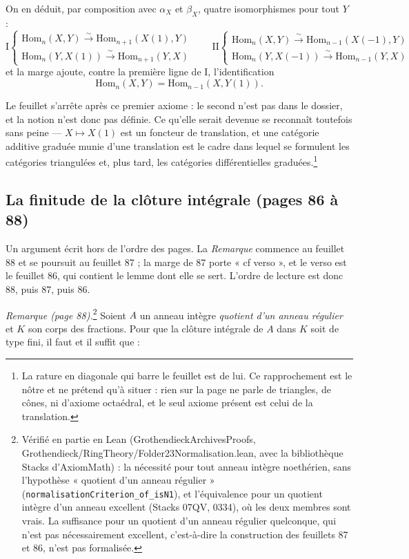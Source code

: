 \documentclass[11pt,a4paper]{article}
\begin{document}
On en déduit, par composition avec $\alpha_{X}$ et $\beta_{X}$, quatre
isomorphismes pour tout $Y$ :
\[
  \text{I}
  \begin{cases}
    \mathrm{Hom}_{n}(X, Y) \xrightarrow{\sim} \mathrm{Hom}_{n+1}(X(1), Y) \\
    \mathrm{Hom}_{n}(Y, X(1)) \xrightarrow{\sim} \mathrm{Hom}_{n+1}(Y, X)
  \end{cases}
  \qquad
  \text{II}
  \begin{cases}
    \mathrm{Hom}_{n}(X, Y) \xrightarrow{\sim} \mathrm{Hom}_{n-1}(X(-1), Y) \\
    \mathrm{Hom}_{n}(Y, X(-1)) \xrightarrow{\sim} \mathrm{Hom}_{n-1}(Y, X)
  \end{cases}
\]
et la marge ajoute, contre la première ligne de I, l'identification
\[
  \mathrm{Hom}_{n}(X,Y) = \mathrm{Hom}_{n-1}(X, Y(1)) .
\]

Le feuillet s'arrête après ce premier axiome : le second n'est pas dans le
dossier, et la notion n'est donc pas définie. Ce qu'elle serait devenue se
reconnaît toutefois sans peine — $X \mapsto X(1)$ est un foncteur de
translation, et une catégorie additive graduée munie d'une translation est le
cadre dans lequel se formulent les catégories triangulées et, plus tard, les
catégories différentielles graduées.\footnote{La rature en diagonale qui barre
le feuillet est de lui. Ce rapprochement est le nôtre et ne prétend qu'à
situer : rien sur la page ne parle de triangles, de cônes, ni d'axiome
octaédral, et le seul axiome présent est celui de la translation.}

\subsection*{La finitude de la clôture intégrale (pages 86 à 88)}

Un argument écrit hors de l'ordre des pages. La \emph{Remarque} commence au
feuillet 88 et se poursuit au feuillet 87 ; la marge de 87 porte « cf verso », et
le verso est le feuillet 86, qui contient le lemme dont elle se sert. L'ordre de
lecture est donc 88, puis 87, puis 86.

\emph{Remarque (page 88).}\footnote{Vérifié en partie en Lean
(GrothendieckArchivesProofs, Grothendieck/RingTheory/Folder23Normalisation.lean, avec la bibliothèque Stacks d'AxiomMath) :
la nécessité pour tout anneau intègre noethérien, sans l'hypothèse « quotient d'un
anneau régulier » (\texttt{normalisationCriterion\_of\_isN1}), et l'équivalence
pour un quotient intègre d'un anneau excellent (Stacks 07QV, 0334), où les deux
membres sont vrais. La suffisance pour un quotient d'un anneau régulier quelconque,
qui n'est pas nécessairement excellent, c'est-à-dire la construction des feuillets 87
et 86, n'est pas formalisée.} Soient $A$ un anneau intègre \emph{quotient d'un
anneau régulier} et $K$ son corps des fractions. Pour que la clôture intégrale
de $A$ dans $K$ soit de type fini, il faut et il suffit que :
\end{document}
